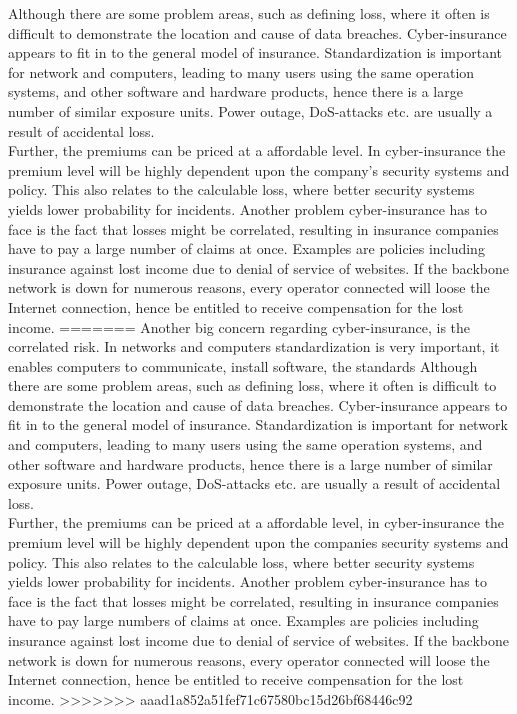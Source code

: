     
 Although there are some problem areas, such as defining loss, where it often is difficult to demonstrate the location and cause of data breaches. Cyber-insurance appears to fit in to the general model of insurance. Standardization is important for network and computers, leading to many users using the same operation systems, and other software and hardware products, hence there is a large number of similar exposure units. Power outage, DoS-attacks etc. are usually a result of accidental loss.
 \\ Further, the premiums can be priced at a affordable level. In cyber-insurance the premium level will be highly dependent upon the company's security systems and policy. This also relates to the calculable loss, where better security systems yields lower probability for incidents. \cite{robinson2012incentives}
 Another problem cyber-insurance has to face is the fact that losses might be correlated, resulting in insurance companies have to pay a large number of claims at once. Examples are policies including insurance against lost income due to denial of service of websites. If the backbone network is down for numerous reasons, every operator connected will loose the Internet connection, hence be entitled to receive compensation for the lost income.   
=======
Another big concern regarding cyber-insurance, is the correlated risk. In networks and computers
 standardization is very important, it enables computers to communicate, install software,
  the standards  
 Although there are some problem areas, such as defining loss, where it often is difficult to
  demonstrate the location and cause of data breaches. Cyber-insurance appears to fit in to
   the general model of insurance. Standardization is important for network and computers, leading to
    many users using the same operation systems, and other software and hardware products, 
    hence there is a large number of similar exposure units. Power outage, DoS-attacks etc. 
    are usually a result of accidental loss.
 \\ Further, the premiums can be priced at a affordable level, in cyber-insurance the premium level
  will be highly dependent upon the companies security systems and policy.
   This also relates to the calculable loss, where better security systems
    yields lower probability for incidents. \cite{robinson2012incentives}
 Another problem cyber-insurance has to face is the fact that losses might be correlated, 
 resulting in insurance companies have to pay large numbers of claims at once. Examples are 
 policies including insurance against lost income due to denial of service of websites. 
 If the backbone network is down for numerous reasons, 
 every operator connected will loose the Internet connection, 
 hence be entitled to receive compensation for the lost income.   
>>>>>>> aaad1a852a51fef71c67580bc15d26bf68446c92
 
